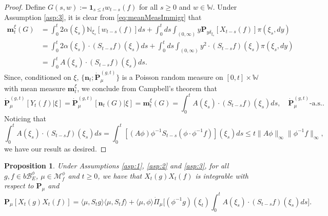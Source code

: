 \documentclass[UTF8]{pkuthss}
\theoremstyle{plain}
\newtheorem{prop}[thm]{Proposition}
\theoremstyle{definition}
\numberwithin{equation}{section}
\begin{document}
\begin{proof}
	Define $G(s,w) := \mathbf 1_{s\leq t} w_{t-s}(f)$ for all $s \geq 0$ and $w \in \mathbb W$.
	Under Assumption \ref{asp:3}, it is clear from \eqref{eq:meanMeasImmigr} that
\begin{align}
	\mathbf m_t^\xi(G)
	&= \int_0^t 2 \alpha(\xi_s) \mathbb N_{\xi_s}[w_{t-s}(f)]ds + \int_0^t ds \int_{(0,\infty)} y \mathbf P_{y \delta_{\xi_s}}[X_{t-s}(f)] \pi(\xi_s,dy) \\
	&= \int_0^t 2 \alpha(\xi_s)\cdot (S_{t-s}f)(\xi_s) ds + \int_0^t ds \int_{(0,\infty)} y^2 \cdot (S_{t-s} f)(\xi_s) \pi(\xi_s, dy)\\
    &= \int_0^t A(\xi_s) \cdot (S_{t-s} f) (\xi_s) ds.
\end{align}
	Since, conditioned on $\xi$,  $\{\mathbf n_t;\dot{\mathbf P}^{(g,t)}_\mu\}$ is a
	Poisson random measure on $[0,t] \times \mathbb W$
	with mean measure $\mathbf m_t^\xi$, we conclude from Campbell's theorem that
\[
	\dot{\mathbf P}^{(g,t)}_{\mu}[Y_t(f)|\xi]
	= \dot{\mathbf P}^{(g,t)}_{\mu} [\mathbf n_t(G)|\xi]
	= \mathbf m_t^\xi(G)
    = \int_0^t A(\xi_s) \cdot (S_{t-s} f) (\xi_s) ds,
	\quad \dot{\mathbf P}^{(g,t)}_{\mu} \text{-a.s.}.
\]
	Noticing that
\[
   	\int_0^t A(\xi_s) \cdot (S_{t-s} f) (\xi_s) ds
	 = \int_0^t [(A \phi) \phi^{-1} S_{t-s}(\phi \cdot \phi^{-1} f)](\xi_s)ds
	\leq t \|A\phi\|_\infty \|\phi^{-1}f\|_\infty,
\]
	we have our result as desired.
\end{proof}
\begin{prop}\label{prop:covanrance}
	Under Assumptions \ref{asp:1}, \ref{asp:2} and \ref{asp:3}, for all $g,f\in b\mathscr B^\phi_E$, $\mu \in \mathcal M^\phi_f$
	and $t\geq 0$,
	we have that $X_t(g)X_t(f)$ is integrable with respect to $\mathbf P_\mu$ and
\begin{equation}\label{eq:covanrance}
	\mathbf P_\mu[X_t(g) X_t( f)]
	= \langle\mu, S_t g \rangle \langle\mu, S_t f\rangle + \langle\mu, \phi\rangle \dot{\Pi}_{\mu} \Big[(\phi^{-1} g)(\xi_t) \int_0^t A(\xi_s) \cdot (S_{t-s} f)(\xi_s) ds\Big].
\end{equation}
\end{prop}
\end{document}
